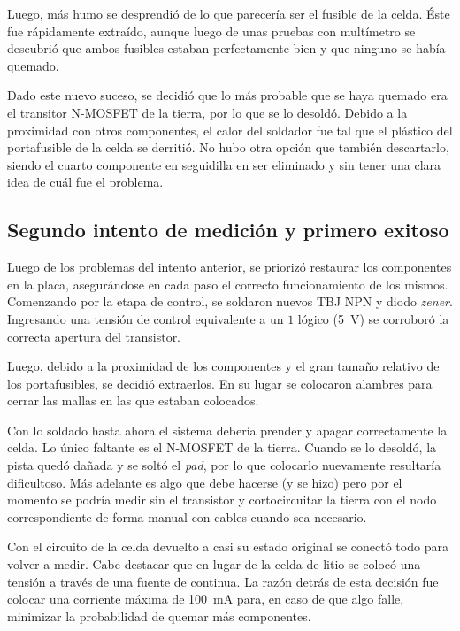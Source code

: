 Luego, más humo se desprendió de lo que parecería ser el fusible de la celda. Éste fue rápidamente extraído, aunque luego de unas pruebas con multímetro se descubrió que ambos fusibles estaban perfectamente bien y que ninguno se había quemado.

Dado este nuevo suceso, se decidió que lo más probable que se haya quemado era el transitor N-MOSFET de la tierra, por lo que se lo desoldó. Debido a la proximidad con otros componentes, el calor del soldador fue tal que el plástico del portafusible de la celda se derritió. No hubo otra opción que también descartarlo, siendo el cuarto componente en seguidilla en ser eliminado y sin tener una clara idea de cuál fue el problema.

\subsection{Segundo intento de medición y primero exitoso}

Luego de los problemas del intento anterior, se priorizó restaurar los componentes en la placa, asegurándose en cada paso el correcto funcionamiento de los mismos. Comenzando por la etapa de control, se soldaron nuevos TBJ NPN y diodo \textit{zener}. Ingresando una tensión de control equivalente a un $1$ lógico (\SI{5}{\volt}) se corroboró la correcta apertura del transistor.

Luego, debido a la proximidad de los componentes y el gran tamaño relativo de los portafusibles, se decidió extraerlos. En su lugar se colocaron alambres para cerrar las mallas en las que estaban colocados.

Con lo soldado hasta ahora el sistema debería prender y apagar correctamente la celda. Lo único faltante es el N-MOSFET de la tierra. Cuando se lo desoldó, la pista quedó dañada y se soltó el \textit{pad}, por lo que colocarlo nuevamente resultaría dificultoso. Más adelante es algo que debe hacerse (y se hizo) pero por el momento se podría medir sin el transistor y cortocircuitar la tierra con el nodo correspondiente de forma manual con cables cuando sea necesario.

Con el circuito de la celda devuelto a casi su estado original se conectó todo para volver a medir. Cabe destacar que en lugar de la celda de litio se colocó una tensión a través de una fuente de continua. La razón detrás de esta decisión fue colocar una corriente máxima de \SI{100}{\milli\ampere} para, en caso de que algo falle, minimizar la probabilidad de quemar más componentes.

